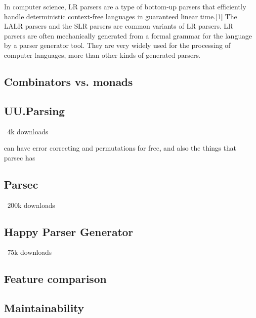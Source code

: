 In computer science, LR parsers are a type of bottom-up parsers that efficiently handle deterministic context-free languages in guaranteed linear time.[1] The LALR parsers and the SLR parsers are common variants of LR parsers. LR parsers are often mechanically generated from a formal grammar for the language by a parser generator tool. They are very widely used for the processing of computer languages, more than other kinds of generated parsers.

\subsection{Combinators vs. monads}
\lipsum[1]

\subsection{UU.Parsing}
%
~4k downloads

can have error correcting and permutations for free, and also the things that parsec has
\lipsum[1]

\subsection{Parsec}
%
~200k downloads

\subsection{Happy Parser Generator}
%
~75k downloads

\subsection{Feature comparison}
\lipsum[1]

\subsection{Maintainability}
\lipsum[1]
